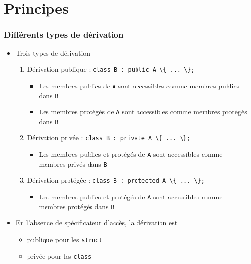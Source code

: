 \section{Principes}

\begin{frame}
\frametitle{Différents types de dérivation}
\begin{itemize}[<+->]
\item Trois types de dérivation
	\begin{enumerate}
	\item Dérivation publique : \lstinline|class B : public A \{ ... \};|
		\begin{itemize}
		\item Les membres publics de \texttt{A} sont accessibles comme membres publics dans \texttt{B}
		\item Les membres protégés de \texttt{A} sont accessibles comme membres protégés dans \texttt{B}
		\end{itemize}
	\item Dérivation privée : \lstinline|class B : private A \{ ... \};|
		\begin{itemize}
		\item Les membres publics et protégés de \texttt{A} sont accessibles comme membres privés dans \texttt{B}
		\end{itemize}
	\item Dérivation protégée : \lstinline|class B : protected A \{ ... \};|
		\begin{itemize}
		\item Les membres publics et protégés de \texttt{A} sont accessibles comme membres protégés dans \texttt{B}
		\end{itemize}
	\end{enumerate}
\item En l'absence de spécificateur d'accès, la dérivation est
	\begin{itemize}
	\item publique pour les \lstinline|struct|
	\item privée pour les \lstinline|class|
	\end{itemize}
\end{itemize}
\end{frame}

